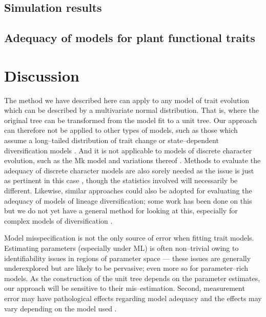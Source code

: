 \documentclass[12pt]{article}
\begin{document}
\subsection*{Simulation results}

\subsection*{Adequacy of models for plant functional traits}


\section*{Discussion}

The method we have described here can apply to any model of trait evolution which can be described by a multivariate normal distribution. That is, where the original tree can be transformed from the model fit to a unit tree. Our approach can therefore not be applied to other types of models, such as those which assume a long--tailed distribution of trait change \citep[e.g.][]{Landis2012} or state--dependent diversification models \citep[e.g.][]{Bokma2008, Bokma2010, FitzJohn2010}. And it is not applicable to models of discrete character evolution, such as the Mk model \citep{Pagel1994, Lewis2001} and variations thereof \citep[e.g.][]{Maddison2007, WagnerMarcot2010, Mazeralli2012, Beaulieu2013} \citep[but see Felsenstein's threshold model;][]{Felsenstein2005, Felsenstein2012}. Methods to evaluate the adequacy of discrete character models are also sorely needed as the issue is just as pertinent in this case \citep{ReadNee1995, MaddisonFitzJohn}, though the statistics involved will necessarily be different. Likewise, similar approaches could also be adopted for evaluating the adequacy of models of lineage diversification; some work has been done on this \citep[e.g.][]{Rabosky2009AmNat, Rabosky2012, Hohna2013} but we do not yet have a general method for looking at this, especially for complex models of diversification \citep[e.g.][]{Stadler2011, Etienne2012}.

Model misspecification is not the only source of error when fitting trait models. Estimating parameters (especially under ML) is often non--trivial owing to identifiability issues in regions of parameter space \citep{HoAne2008, HoAne2012} --- these issues are generally underexplored but are likely to be pervasive; even more so for parameter--rich models. As the construction of the unit tree depends on the parameter estimates, our approach will be sensitive to their mis--estimation. Second, measurement error may have pathological effects regarding model adequacy \citep{HarmonLosos2005} and the effects may vary depending on the model used \citep{RevellReynolds2012, PennellPE}.
\end{document}
